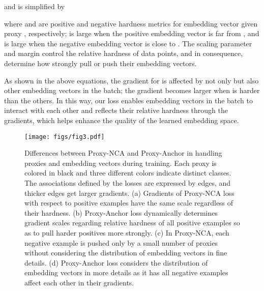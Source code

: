 \documentclass[10pt,twocolumn,letterpaper]{article}
\begin{document}
and is simplified by
\fi

where  and  are positive and negative hardness metrics for embedding vector  given proxy , respectively;  is large when the positive embedding vector  is far from , and  is large when the negative embedding vector  is close to .
The scaling parameter  and margin  control the relative hardness of data points, and in consequence, determine how strongly pull or push their embedding vectors.

As shown in the above equations, the gradient for  is affected by not only  but also other embedding vectors in the batch;
the gradient becomes larger when  is harder than the others.
In this way, our loss enables embedding vectors in the batch to interact with each other and reflects their relative hardness through the gradients, which helps enhance the quality of the learned embedding space.



\begin{figure*} [!t]
\centering
\texttt{[image: figs/fig3.pdf]}
\caption{
Differences between Proxy-NCA and Proxy-Anchor in handling proxies and embedding vectors during training.
Each 
proxy is colored in black and three different colors indicate distinct classes. 
The associations defined by the losses are expressed by edges, and thicker edges get larger gradients.
(a) Gradients of Proxy-NCA loss with respect to positive examples have the same scale regardless of their hardness.
(b) Proxy-Anchor loss dynamically determines gradient scales regarding relative hardness of all positive examples so as to pull harder positives more strongly.
(c) In Proxy-NCA, each negative example is pushed only by a small number of proxies without considering the distribution of embedding vectors in fine details.
(d) Proxy-Anchor loss considers the distribution of embedding vectors in more details as it has all negative examples affect each other in their gradients.
} 
\label{fig:proxy_losses_comparision}
\end{figure*}
\end{document}

